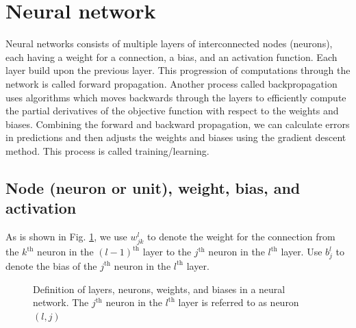 \documentclass{article}
\newcommand{\tmop}[1]{\ensuremath{\operatorname{#1}}}
\begin{document}
\section{Neural network}

Neural networks consists of multiple layers of interconnected nodes (neurons),
each having a weight for a connection, a bias, and an activation function.
Each layer build upon the previous layer. This progression of computations
through the network is called forward propagation. Another process called
backpropagation uses algorithms which moves backwards through the layers to
efficiently compute the partial derivatives of the objective function with
respect to the weights and biases. Combining the forward and backward
propagation, we can calculate errors in predictions and then adjusts the
weights and biases using the gradient descent method. This process is called
training/learning.

\subsection{ Node (neuron or unit), weight, bias, and activation}

As is shown in Fig. \ref{22-3-13-a1}, we use $w_{j k}^l$ to denote the weight
for the connection from the $k^{\tmop{th}}$ neuron in the $(l -
1)^{\tmop{th}}$ layer to the $j^{\tmop{th}}$ neuron in the $l^{\tmop{th}}$
layer. Use $b_j^l$ to denote the bias of the $j^{\tmop{th}}$ neuron in the
$l^{\tmop{th}}$ layer.

\begin{figure}[h]
  \caption{\label{22-3-13-a1}Definition of layers, neurons, weights, and
  biases in a neural network. The $j^{\tmop{th}}$ neuron in the
  $l^{\tmop{th}}$ layer is referred to as neuron $(l, j)$}
\end{figure}
\end{document}
